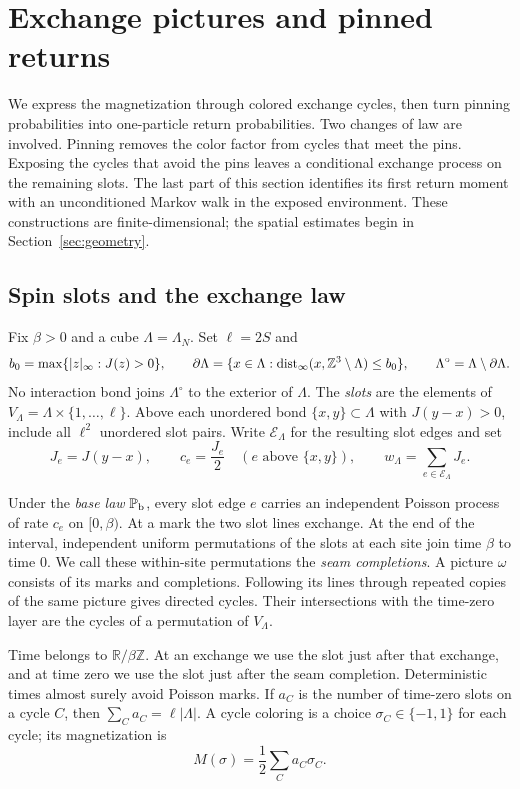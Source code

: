 \section{Exchange pictures and pinned returns}\label{sec:pins}

We express the magnetization through colored exchange cycles, then turn
pinning probabilities into one-particle return probabilities.  Two changes
of law are involved.  Pinning removes the color factor from cycles that
meet the pins.  Exposing the cycles that avoid the pins leaves a conditional
exchange process on the remaining slots.  The last part of this section
identifies its first return moment with an unconditioned Markov walk in the
exposed environment.  These constructions are finite-dimensional; the
spatial estimates begin in Section~\ref{sec:geometry}.

\subsection{Spin slots and the exchange law}

Fix $\beta>0$ and a cube $\Lambda=\Lambda_N$.  Set $\ell=2S$ and
\[
 b_0=\max\{|z|_\infty:J(z)>0\},\qquad
 \partial\Lambda=\{x\in\Lambda:
       \operatorname{dist}_\infty(x,\mathbb Z^3\setminus\Lambda)\le b_0\},\qquad
 \Lambda^\circ=\Lambda\setminus\partial\Lambda.
\]
No interaction bond joins $\Lambda^\circ$ to the exterior of $\Lambda$.
The \emph{slots} are the elements of
$V_\Lambda=\Lambda\times\{1,\ldots,\ell\}$.  Above each unordered
bond $\{x,y\}\subset\Lambda$ with $J(y-x)>0$, include all $\ell^2$
unordered slot pairs.  Write $\mathcal E_\Lambda$ for the resulting
slot edges and set
\[
 J_e=J(y-x),\qquad c_e=\frac{J_e}{2}
       \quad(e\text{ above }\{x,y\}),\qquad
 w_\Lambda=\sum_{e\in\mathcal E_\Lambda}J_e.
\]

Under the \emph{base law} $\mathbb P_{\rm b}$, every slot edge $e$
carries an independent Poisson process of rate $c_e$ on $[0,\beta)$.
At a mark the two slot lines exchange.  At the end of the interval,
independent uniform permutations of the slots at each site join time
$\beta$ to time $0$.  We call these within-site permutations the
\emph{seam completions}.  A picture $\omega$ consists of its marks and
completions.  Following its lines through repeated copies of the same
picture gives directed cycles.  Their intersections with the time-zero
layer are the cycles of a permutation of $V_\Lambda$.

Time belongs to $\mathbb R/\beta\mathbb Z$.  At an exchange we use the
slot just after that exchange, and at time zero we use the slot just
after the seam completion.  Deterministic times almost surely avoid
Poisson marks.  If $a_C$ is the number of time-zero slots on a cycle
$C$, then $\sum_Ca_C=\ell|\Lambda|$.  A cycle coloring is a choice
$\sigma_C\in\{-1,1\}$ for each cycle; its magnetization is
\[
                 M(\sigma)=\frac12\sum_Ca_C\sigma_C.
\]


